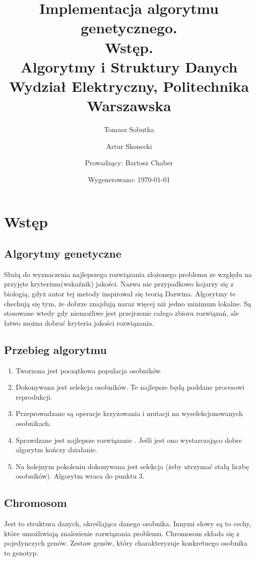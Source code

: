 \documentclass[bibtotocnumbered, headsepline,normalheadings,12pt,polish]{scrreprt}
\begin{document}
\title{\textbf{Implementacja algorytmu genetycznego.\\ Wstęp.}\\
\small{Algorytmy i Struktury Danych\\ Wydział Elektryczny, Politechnika Warszawska}}
\author{Tomasz Sobutka \and Artur Skonecki \and Prowadzący: Bartosz Chaber}
\date{Wygenerowano: \today}
\maketitle

\chapter{Wstęp}
\section{Algorytmy genetyczne }
Służą do wyznaczenia najlepszego rozwiązania złożonego problemu ze względu na przyjęte kryterium(wskaźnik) jakości. Nazwa nie przypadkowo kojarzy się z biologią, gdyż autor tej metody inspirował się teorią Darwina. Algorytmy te chechują się tym, że dobrze znajdują naraz więcej niż jedno minimum lokalne. Są stosowane wtedy gdy niemożliwe jest przejrzenie całego zbioru rozwiązań, ale łatwo można dobrać kryteria jakości rozwiązania. 
 
\section{ Przebieg algorytmu}
\begin{enumerate}
    \item Tworzona jest początkowa populacja osobników
    \item Dokonywana jest selekcja osobników. Te najlepsze będą poddane procesowi reprodukcji.
    \item Przeprowadzane są operacje krzyżowania i mutacji na wyselekcjonowanych osobnikach.
    \item Sprawdzane jest najlepsze rozwiązanie . Jeśli jest ono wystarczająco dobre algorytm kończy działanie. 
    \item Na kolejnym pokoleniu dokonywana jest selekcja (żeby utrzymać stałą liczbę osobników). Algorytm wraca do punktu 3.
\end{enumerate}

\section{Chromosom}
Jest to struktura danych, określająca danego osobnika. Innymi słowy są to cechy, które umożliwiają znalezienie rozwiązania problemu. Chromosom składa się z pojedynczych genów. Zestaw genów, który charakteryzuje konkretnego osobnika to genotyp.
\end{document}
